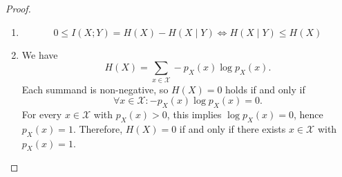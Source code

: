 \begin{proof}
    \begin{enumerate}
        \item
            \[
                0 \le I(X; Y) = H(X) - H(X \mid Y) \iff H(X \mid Y) \le H(X)
            \]

        \item
            We have
            \[
                H(X) = \sum_{x \in \mathcal{X}} -p_X(x) \log p_X(x).
            \]
            Each summand is non-negative, so $H(X) = 0$ holds if and only if
            \[
                \forall x \in \mathcal{X}: -p_X(x) \log p_X(x) = 0.
            \]
            For every $x \in \mathcal{X}$ with $p_X(x) > 0$, this implies $\log p_X(x) = 0$, hence $p_X(x) = 1$.
            Therefore, $H(X) = 0$ if and only if there exists $x \in \mathcal{X}$ with $p_X(x) = 1$.


\end{enumerate}
\end{proof}
